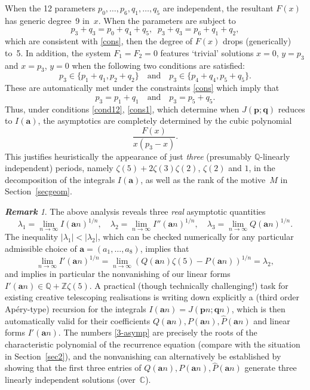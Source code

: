 \documentclass[12pt,reqno]{amsart}
\theoremstyle{remark}
\newtheorem{remark}{\bf Remark}
\newcommand\ba{\boldsymbol a}
\newcommand\bp{\boldsymbol p}
\newcommand\bq{\boldsymbol q}
\begin{document}
When the 12 parameters $p_0,\dots,p_6,q_1,\dots,q_5$ are independent, the resultant $F(x)$ has generic degree~9 in~$x$. When the parameters are subject to
\begin{equation}
p_3+q_3=p_0+q_4+q_5, \;\;
p_3+q_3=p_6+q_1+q_2,
\label{cond12}
\end{equation}
which  are consistent with \eqref{cons},
then the degree of $F(x)$ drops (generically) to~5.
In addition, the system $F_1=F_2=0$ features `trivial' solutions $x=0$, $y=p_3$ and $x=p_3$, $y=0$ when the following two conditions are satisfied:
\[
p_3\in\{p_1+q_1,p_2+q_2\} \quad\text{and}\quad p_3\in\{p_4+q_4,p_5+q_5\}.
\]
These are automatically met under the constraints \eqref{cons} which imply that
\begin{equation}
p_3=p_1+q_1 \quad\text{and}\quad p_3=p_5+q_5.
\label{cons1}
\end{equation}
Thus, under conditions \eqref{cond12}, \eqref{cons1}, which determine when  $J(\bp;\bq)$  reduces to $I(\ba)$, the asymptotics are completely determined by the cubic  polynomial
 \begin{equation} \label{eqn: Fcubic}
\frac{F(x)}{x(p_3-x)}.
\end{equation}
This justifies heuristically the appearance of just \emph{three} (presumably $\mathbb Q$-linearly independent) periods, namely $\zeta(5)+2\zeta(3)\zeta(2)$, $\zeta(2)$ and $1$, in the decomposition of the integrals $I(\ba)$, as well as the rank of the motive~$M$ in Section~\ref{secgeom}. 

\begin{remark}
\label{rem:rec}
The above analysis reveals three \emph{real} asymptotic quantities
\begin{equation}
\lambda_1=\lim_{n\to\infty}I(\ba n)^{1/n},
\quad
\lambda_2=\lim_{n\to\infty}I''(\ba n)^{1/n},
\quad
\lambda_3=\lim_{n\to\infty}Q(\ba n)^{1/n}.
\label{3-asymp}
\end{equation}
The inequality $|\lambda_1|<|\lambda_2|$, which can be checked numerically for any particular admissible choice of $\ba=(a_1,\dots,a_8)$, implies that
\[
\lim_{n\to\infty}I'(\ba n)^{1/n}
=\lim_{n\to\infty}(Q(\ba n)\zeta(5)-P(\ba n))^{1/n}
=\lambda_2,
\]
and implies 
in particular  the nonvanishing of our linear forms $I'(\ba n)\in\mathbb Q+\mathbb Z\zeta(5)$.
A practical (though technically challenging!) task for existing creative telescoping realisations is writing down explicitly a (third order Ap\'ery-type) recursion for the integrals $I(\ba n)=J(\bp n;\bq n)$, which is then automatically valid for their coefficients $Q(\ba n),P(\ba n),\hat P(\ba n)$ and linear forms $I'(\ba n)$.
The numbers \eqref{3-asymp} are precisely the roots of the characteristic polynomial of the recurrence equation (compare with the situation in Section~\ref{sec2}), and the nonvanishing can alternatively be established by showing that the first three entries of $Q(\ba n),P(\ba n),\hat P(\ba n)$ generate three linearly independent solutions (over~$\mathbb C$).
\end{remark}
\end{document}
